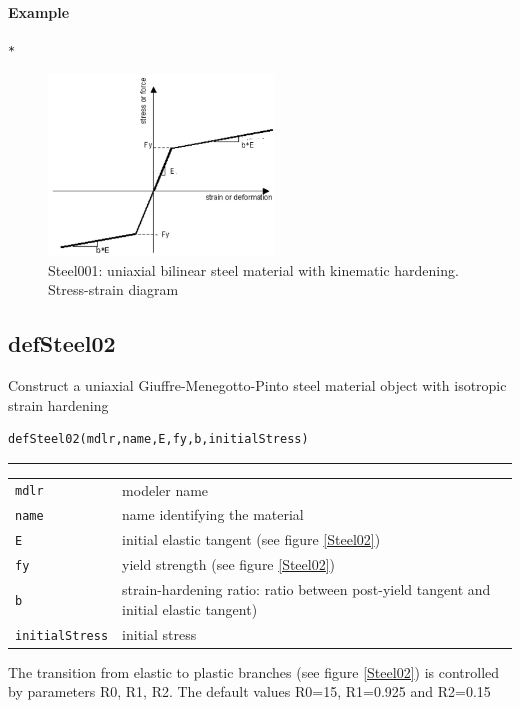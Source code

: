 \paragraph{Example}
\begin{verbatim}
*
\end{verbatim}

\begin{figure}[h]
\centering
\includegraphics[width=60mm]{materials/figures/Steel01}
\caption{Steel001: uniaxial bilinear steel material with kinematic hardening. Stress-strain diagram}\label{Steel01}
\end{figure}


\subsection{defSteel02}
\noindent Construct a uniaxial Giuffre-Menegotto-Pinto steel material object with isotropic strain hardening
\begin{verbatim}
defSteel02(mdlr,name,E,fy,b,initialStress)
\end{verbatim}
\vspace{-10pt}
{\color{grayLines} \rule{\linewidth}{0.25pt}}
\begin{center}
\begin{tabular}{lp{10cm}}
{\tt mdlr} & modeler name \\
{\tt name} & name identifying the material \\
{\tt E} & initial elastic tangent (see figure \ref{Steel02}) \\
{\tt fy} &  yield strength (see figure \ref{Steel02})\\
{\tt b} &  strain-hardening ratio: ratio between post-yield tangent and initial elastic tangent)\\
{\tt initialStress} &  initial stress \\
\end{tabular}
\end{center}
\footnotesize{The transition from elastic to plastic branches  (see figure \ref{Steel02}) is controlled by parameters R0, R1, R2. The default values R0=15, R1=0.925 and R2=0.15}
